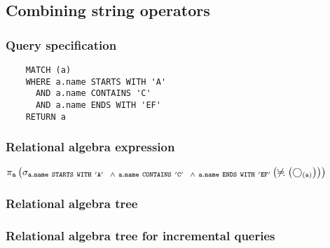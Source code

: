 	\subsection{Combining string operators}

	\subsubsection*{Query specification}

	\begin{lstlisting}
	MATCH (a)
	WHERE a.name STARTS WITH 'A'
	  AND a.name CONTAINS 'C'
	  AND a.name ENDS WITH 'EF'
	RETURN a
	\end{lstlisting}


	\subsubsection*{Relational algebra expression}

	$\projection{\var{a}} \left(\selection{\mathtt{a.name~STARTS~WITH~'A'
	~~\land~a.name~CONTAINS~'C'
	~~\land~a.name~ENDS~WITH~'EF'}} \left(\alldifferent{} \left(\getvertices{a}{}\right)\right)\right)$

	\subsubsection*{Relational algebra tree}


	\subsubsection*{Relational algebra tree for incremental queries}

